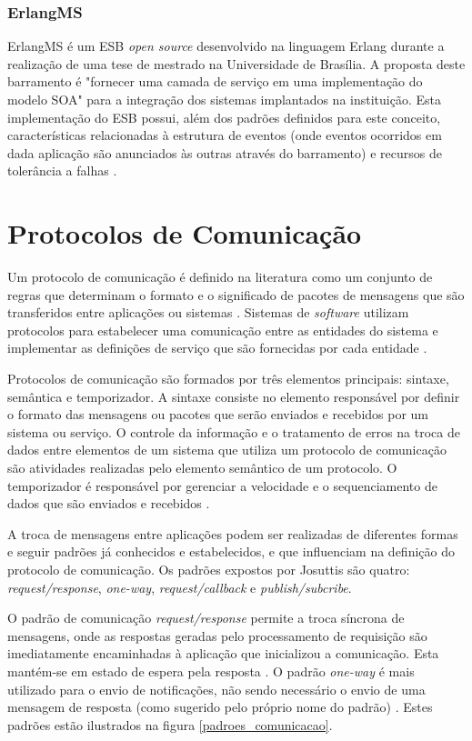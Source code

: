\subsubsection{ErlangMS}
ErlangMS é um ESB \textit{open source} desenvolvido na linguagem Erlang durante a realização de uma tese de mestrado na Universidade de Brasília. A proposta deste barramento é "fornecer uma camada de serviço em uma implementação do modelo SOA" para a integração dos sistemas implantados na instituição. Esta implementação do ESB possui, além dos padrões definidos para este conceito, características relacionadas à estrutura de eventos (onde eventos ocorridos em dada aplicação são anunciados às outras através do barramento) e recursos de tolerância a falhas \cite{agilar_uma_2015}.

\section{Protocolos de Comunicação}
Um protocolo de comunicação é definido na literatura como um conjunto de regras que determinam o formato e o significado de pacotes de mensagens que são transferidos entre aplicações ou sistemas \cite{Stallings_2006}. Sistemas de \textit{software} utilizam protocolos para estabelecer uma comunicação entre as entidades do sistema e implementar as definições de serviço que são fornecidas por cada entidade \cite{Stallings_2006}.

Protocolos de comunicação são formados por três elementos principais: sintaxe, semântica e temporizador. A sintaxe consiste no elemento responsável por definir o formato das mensagens ou pacotes que serão enviados e recebidos por um sistema ou serviço. O controle da informação e o tratamento de erros na troca de dados entre elementos de um sistema que utiliza um protocolo de comunicação são atividades realizadas pelo elemento semântico de um protocolo. O temporizador é responsável por gerenciar a velocidade e o sequenciamento de dados que são enviados e recebidos \cite{Stallings_2006}.

A troca de mensagens entre aplicações podem ser realizadas de diferentes formas e seguir padrões já conhecidos e estabelecidos, e que influenciam na definição do protocolo de comunicação. Os padrões expostos por Josuttis \cite{josuttis_soa_2007} são quatro: \textit{request/response}, \textit{one-way}, \textit{request/callback} e \textit{publish/subcribe}.

O padrão de comunicação \textit{request/response} permite a troca síncrona de mensagens, onde as respostas geradas pelo processamento de requisição são imediatamente encaminhadas à aplicação que inicializou a comunicação. Esta mantém-se em estado de espera pela resposta \cite{josuttis_soa_2007}. O padrão \textit{one-way} é mais utilizado para o envio de notificações, não sendo necessário o envio de uma mensagem de resposta (como sugerido pelo próprio nome do padrão) \cite{josuttis_soa_2007}. Estes padrões estão ilustrados na figura \ref{padroes_comunicacao}.

